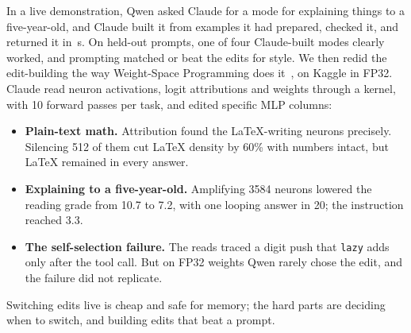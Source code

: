 In a live demonstration, Qwen asked Claude for a mode for explaining things to a five-year-old, and Claude built it from examples it had prepared, checked it, and returned it in \DemoReqTwo\,s. On held-out prompts, one of four Claude-built modes clearly worked, and prompting matched or beat the edits for style. We then redid the edit-building the way Weight-Space Programming does it~\cite{takehi2026wsp}, on Kaggle in FP32. Claude read neuron activations, logit attributions and weights through a kernel, with 10 forward passes per task, and edited specific MLP columns:
\begin{itemize}
\item \textbf{Plain-text math.} Attribution found the LaTeX-writing neurons precisely. Silencing 512 of them cut LaTeX density by 60\% with numbers intact, but LaTeX remained in every answer.
\item \textbf{Explaining to a five-year-old.} Amplifying 3584 neurons lowered the reading grade from 10.7 to 7.2, with one looping answer in 20; the instruction reached 3.3.
\item \textbf{The self-selection failure.} The reads traced a digit push that \texttt{lazy} adds only after the tool call. But on FP32 weights Qwen rarely chose the edit, and the failure did not replicate.
\end{itemize}
Switching edits live is cheap and safe for memory; the hard parts are deciding when to switch, and building edits that beat a prompt.
